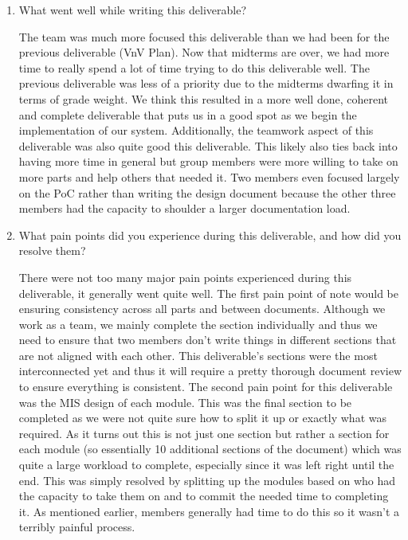 \documentclass[12pt, titlepage]{article}
\begin{document}


\begin{enumerate}
  \item What went well while writing this deliverable? 

  The team was much more focused this deliverable than we had been for the previous deliverable (VnV Plan). Now that
  midterms are over, we had more time to really spend a lot of time trying to do this deliverable well. The previous deliverable
  was less of a priority due to the midterms dwarfing it in terms of grade weight. We think this resulted in a more well done,
  coherent and complete deliverable that puts us in a good spot as we begin the implementation of our system. Additionally, the teamwork
  aspect of this deliverable was also quite good this deliverable. This likely also ties back into having more time in general but group
  members were more willing to take on more parts and help others that needed it. Two members even focused largely on the PoC rather than
  writing the design document because the other three members had the capacity to shoulder a larger documentation load.

  \item What pain points did you experience during this deliverable, and how
    did you resolve them?

    There were not too many major pain points experienced during this deliverable, it generally went quite well. The first pain point of note
    would be ensuring consistency across all parts and between documents. Although we work as a team, we mainly complete the section individually
    and thus we need to ensure that two members don't write things in different sections that are not aligned with each other. This deliverable's sections
    were the most interconnected yet and thus it will require a pretty thorough document review to ensure everything is consistent. The second pain point
    for this deliverable was the MIS design of each module. This was the final section to be completed as we were not quite sure how to split it up or exactly
    what was required. As it turns out this is not just one section but rather a section for each module (so essentially 10 additional sections of the document)
    which was quite a large workload to complete, especially since it was left right until the end. This was simply resolved by splitting up the modules based
    on who had the capacity to take them on and to commit the needed time to completing it. As mentioned earlier, members generally had time to do this so it wasn't
    a terribly painful process.


\end{enumerate}
\end{document}
